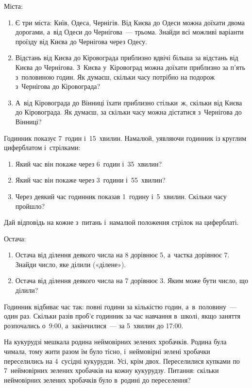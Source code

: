 \problem
Міста:
\begin{enumerate}
  \item Є три міста: Київ, Одеса, Чернігів.
  Від Києва до Одеси можна доїхати двома дорогами,
  а~від Одеси до Чернігова~--- трьома.
  Знайди всі можливі варіанти проїзду від Києва до Чернігова через Одесу.
  \item Відстань від Києва до Кіровограда приблизно вдвічі більша
  за відстань від Києва до Чернігова.
  З~Києва у~Кіровоград можна доїхати приблизно за п'ять з~половиною годин.
  Як думаєш, скільки часу потрібно на подорож з~Чернігова до Кіровограда?
  \item А~від Кіровограда до Вінниці їхати приблизно стільки~ж,
  скільки від Києва до Кіровограда.
  Як думаєш, за скільки часу можна дістатися з~Чернігова до Вінниці?
\end{enumerate}


\problem
Годинник показує 7~годин і~15~хвилин.
Намалюй, уявляючи годинник із круглим циферблатом і~стрілками:
\begin{enumerate}
  \item Який час він покаже через 6~годин і~35~хвилин?
  \item Який час він покаже через 3~години і~55~хвилин?
  \item Через деякий час годинник показав 1~годину і~5~хвилин.
  Скільки часу пройшло?
\end{enumerate}
Дай відповідь на кожне з~питань і~намалюй положення стрілок на циферблаті.


\problem
Остача:
\begin{enumerate}
  \item Остача від ділення деякого числа на 8 дорівнює 5,
  а~частка дорівнює 7.
  Знайди число, яке ділили («ділене»).
  \item Остача від ділення деякого числа на 7 дорівнює 3.
  Яким може бути число, що ділили?
\end{enumerate}


\problem
Годинник відбиває час так: повні години за кількістю годин,
а~в~половину~--- один раз.
Скільки разів проб’є годинник за час навчання в~школі,
якщо заняття розпочались о~9:00, а~закінчилися~--- за 5~хвилин до 17:00.


\problem
На кукурудзі мешкала родина неймовірних зелених хробачків.
Родина була чимала, тому жити разом їм було тісно, і~неймовірні
зелені хробачки переселились на 4~сусідні кукурудзи. Усі, крім двох.
Переселилися купками по 7~неймовірних зелених хробачків на кожну кукурудзу.
Питання: скільки неймовірних зелених хробачків було в~родині до переселення?


